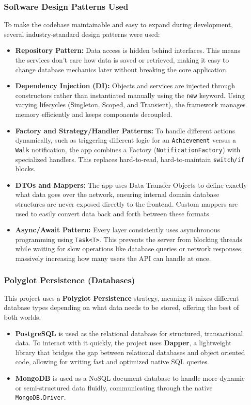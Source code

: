 \subsubsection{Software Design Patterns Used}
To make the codebase maintainable and easy to expand during development, several industry-standard design patterns were used:
\begin{itemize}
    \item \textbf{Repository Pattern:} Data access is hidden behind interfaces. This means the services don't care how data is saved or retrieved, making it easy to change database mechanics later without breaking the core application.
    \item \textbf{Dependency Injection (DI):} Objects and services are injected through constructors rather than instantiated manually using the \texttt{new} keyword. Using varying lifecycles (Singleton, Scoped, and Transient), the framework manages memory efficiently and keeps components decoupled.
    \item \textbf{Factory and Strategy/Handler Patterns:} To handle different actions dynamically, such as triggering different logic for an \texttt{Achievement} versus a \texttt{Walk} notification, the app combines a Factory (\texttt{NotificationFactory}) with specialized handlers. This replaces hard-to-read, hard-to-maintain \texttt{switch/if} blocks.
    \item \textbf{DTOs and Mappers:} The app uses Data Transfer Objects to define exactly what data goes over the network, ensuring internal domain database structures are never exposed directly to the frontend. Custom mappers are used to easily convert data back and forth between these formats.
    \item \textbf{Async/Await Pattern:} Every layer consistently uses asynchronous programming using \texttt{Task<T>}. This prevents the server from blocking threads while waiting for slow operations like database queries or network responses, massively increasing how many users the API can handle at once.
\end{itemize}

\subsubsection{Polyglot Persistence (Databases)}
This project uses a \textbf{Polyglot Persistence} strategy, meaning it mixes different database types depending on what data needs to be stored, offering the best of both worlds:
\begin{itemize}
    \item \textbf{PostgreSQL} is used as the relational database for structured, transactional data. To interact with it quickly, the project uses \textbf{Dapper}, a lightweight library that bridges the gap between relational databases and object oriented code, allowing for writing fast and optimized native SQL queries.
    \item \textbf{MongoDB} is used as a NoSQL document database to handle more dynamic or semi-structured data fluidly, communicating through the native \texttt{MongoDB.Driver}.
\end{itemize}

